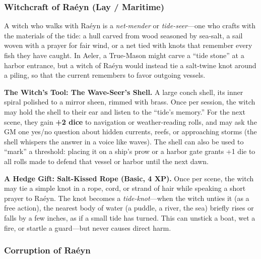 \subsubsection*{Witchcraft of Raéyn (Lay / Maritime)}

A witch who walks with Raéyn is a \textit{net-mender} or \textit{tide-seer}---one who crafts with the materials of the tide: a hull carved from wood seasoned by sea-salt, a sail woven with a prayer for fair wind, or a net tied with knots that remember every fish they have caught. In Aeler, a True-Mason might carve a ``tide stone'' at a harbor entrance, but a witch of Raéyn would instead tie a salt-twine knot around a piling, so that the current remembers to favor outgoing vessels.

\textbf{The Witch's Tool: The Wave-Seer's Shell.} A large conch shell, its inner spiral polished to a mirror sheen, rimmed with brass. Once per session, the witch may hold the shell to their ear and listen to the ``tide's memory.'' For the next scene, they gain \textbf{+2 dice} to navigation or weather-reading rolls, and may ask the GM one yes/no question about hidden currents, reefs, or approaching storms (the shell whispers the answer in a voice like waves). The shell can also be used to ``mark'' a threshold: placing it on a ship's prow or a harbor gate grants +1 die to all rolls made to defend that vessel or harbor until the next dawn.

\textbf{A Hedge Gift: Salt-Kissed Rope (Basic, 4 XP).} Once per scene, the witch may tie a simple knot in a rope, cord, or strand of hair while speaking a short prayer to Raéyn. The knot becomes a \textit{tide-knot}---when the witch unties it (as a free action), the nearest body of water (a puddle, a river, the sea) briefly rises or falls by a few inches, as if a small tide has turned. This can unstick a boat, wet a fire, or startle a guard---but never causes direct harm.

\subsubsection*{Corruption of Raéyn}

